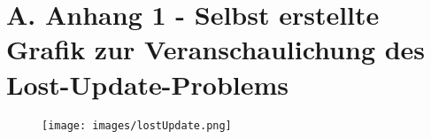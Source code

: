 
\addchap{\appendixPhrase}

\section*{A. Anhang 1 - Selbst erstellte Grafik zur Veranschaulichung des Lost-Update-Problems}

\begin{figure}[H]
	\centering
	\texttt{[image: images/lostUpdate.png]}
\end{figure}